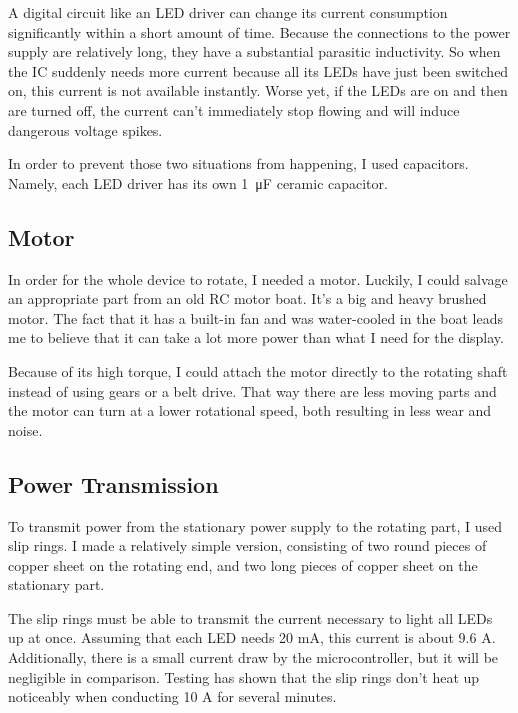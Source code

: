 \documentclass[a4paper, 11pt, titlepage]{report}
\begin{document}
A digital circuit like an LED driver can change its current consumption significantly within a
short amount of time. Because the connections to the power supply are relatively long, they have
a substantial parasitic inductivity. So when the IC suddenly needs more current because all its
LEDs have just been switched on, this current is not available instantly. Worse yet, if the LEDs
are on and then are turned off, the current can't immediately stop flowing and will induce
dangerous voltage spikes.

In order to prevent those two situations from happening, I used capacitors. Namely, each LED
driver has its own \SI{1}{\micro\farad}  ceramic capacitor.



\subsection{Motor}

In order for the whole device to rotate, I needed a motor. Luckily, I could salvage an appropriate
part from an old RC motor boat. It's a big and heavy brushed motor. The fact that it has a
built-in fan and was water-cooled in the boat leads me to believe that it can take a lot more
power than what I need for the display. 

Because of its high torque, I could attach the motor directly to the rotating shaft instead of
using gears or a belt drive. That way there are less moving parts and the motor can turn at a
lower rotational speed, both resulting in less wear and noise.



\subsection{Power Transmission}

To transmit power from the stationary power supply to the rotating part, I used slip rings. I made
a relatively simple version, consisting of two round pieces of copper sheet on the rotating end,
and two long pieces of copper sheet on the stationary part.

The slip rings must be able to transmit the current necessary to light all LEDs up at once.
Assuming that each LED needs 20 mA, this current is about 9.6 A. Additionally, there is a small
current draw by the microcontroller, but it will be negligible in comparison. Testing has shown
that the slip rings don't heat up noticeably when conducting 10 A for several minutes.
\end{document}
